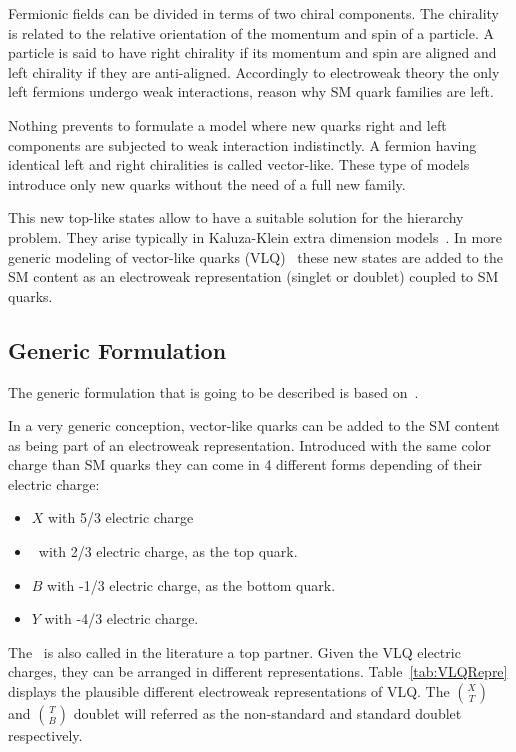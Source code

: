 Fermionic fields can be divided in terms of two chiral components. The chirality is related to the relative orientation of the momentum and spin of a particle. A particle is said to have right chirality if its momentum and spin are aligned and left chirality if they are anti-aligned.  Accordingly to electroweak theory the only left fermions undergo weak interactions, reason why SM quark families are left. 

Nothing prevents to formulate a model where new quarks right and left components are subjected to weak interaction indistinctly. A fermion having identical left and right chiralities is called vector-like. These type of models introduce only new quarks without the need of a full new family.

This new top-like states allow to have a suitable solution for the hierarchy problem. They arise typically in Kaluza-Klein extra dimension models~\cite{Kaluza:1921tu, Contino:2006qr, Matsedonskyi:2012ym, Dissertori:2010ug}. In more generic modeling of vector-like quarks (VLQ)~\cite{Aguilar-Saavedra:2013qpa, Buchkremer:2013bha} these new states are added to the SM content as an electroweak representation (singlet or doublet) coupled to SM quarks.

\subsection{Generic Formulation}
\label{sec:form}

The generic formulation that is going to be described is based on~\cite{Buchkremer:2013bha, Cacciapaglia:2011fx}.

In a very generic conception, vector-like quarks can be added to the SM content as being part of an electroweak representation. Introduced with the same color charge than SM quarks they can come in 4 different forms depending of their electric charge:
\begin{itemize}
\item $X$ with 5/3 electric charge
\item \Tp~with 2/3 electric charge, as the top quark.
\item $B$ with -1/3 electric charge, as the bottom quark.
\item $Y$ with -4/3 electric charge.
\end{itemize}

The \Tp~is also called in the literature a top partner. Given the VLQ electric charges, they can be arranged in different representations. Table~\ref{tab:VLQRepre} displays the plausible different electroweak representations of VLQ. The $\binom{X}{T}$ and $\binom{T}{B}$ doublet will referred as the non-standard and standard doublet respectively.  

